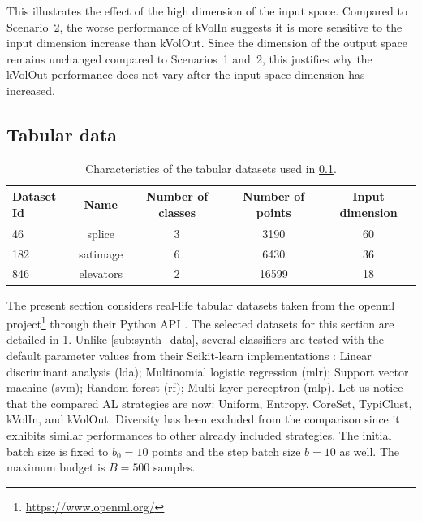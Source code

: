 \documentclass[twoside]{article}
\theoremstyle{definition}
\theoremstyle{remark}
\begin{document}
%
This illustrates the effect of the high dimension of the input space. Compared to Scenario~2, the worse performance of kVolIn suggests it is more sensitive to the input dimension increase than kVolOut. Since the dimension of the output space remains unchanged compared to Scenarios~1 and~2, this justifies why the kVolOut performance does not vary after the input-space dimension has increased. 





\subsection{Tabular data}
\label{sub:tabular_data}

\begin{table}[h]
    \centering
    \caption{Characteristics of the tabular datasets used in \cref{sub:tabular_data}.}
    \label{tab:tab_exp_char}
    \begin{tabular}{lcccc}
    \toprule
        Dataset Id & Name & Number of classes & Number of points & Input dimension \\
    \midrule
         46      & splice      & 3 & 3190 & 60 \\
         182     & satimage    & 6 & 6430 & 36 \\
         846     & elevators   & 2 & 16599 & 18\\
    \bottomrule
    \end{tabular}
\end{table}
%
The present section considers real-life tabular datasets taken from the openml project\footnote{\url{https://www.openml.org/}} through their Python API \citep{feurerOpenMLPythonExtensiblePython2021}. 
The selected datasets for this section are detailed in \cref{tab:tab_exp_char}.
%
Unlike \cref{sub:synth_data}, several classifiers are tested with the default parameter values from their Scikit-learn implementations \citep{pedregosaScikitlearnMachineLearning2011}:
Linear discriminant analysis (lda);
Multinomial logistic regression (mlr);
Support vector machine (svm);
Random forest (rf);
Multi layer perceptron (mlp). Let us notice that the compared AL strategies are now: Uniform, Entropy, CoreSet, TypiClust, kVolIn, and kVolOut.
%
Diversity has been excluded from the comparison since it exhibits similar performances to other already included strategies. 
%
The initial batch size is fixed to $b_0=10$ points and the step batch size $b=10$ as well. The maximum budget is $B=500$ samples.
\end{document}
